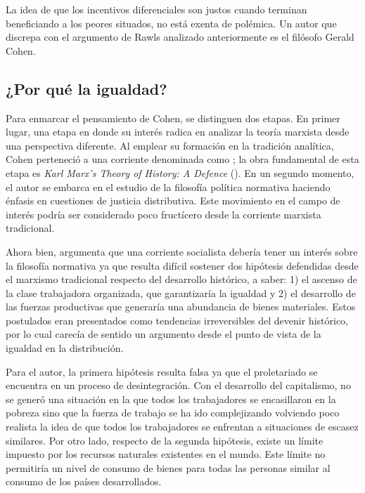 
La idea de que los incentivos diferenciales son justos cuando terminan beneficiando a los peores situados, no está exenta de polémica. Un autor que discrepa con el argumento de Rawls analizado anteriormente es el filósofo Gerald Cohen. 

\subsection{¿Por qué la igualdad?}

Para enmarcar el pensamiento de Cohen, se distinguen dos etapas. En primer lugar, una etapa en donde su interés radica en analizar la teoría marxista desde una perspectiva diferente. Al emplear su formación en la tradición analítica, Cohen perteneció a una corriente denominada como ; la obra fundamental de esta etapa es \textit{Karl Marx's Theory of History: A Defence} (\citeyear{Cohen_1978}). En un segundo momento, el autor se embarca en el estudio de la filosofía política normativa haciendo énfasis en cuestiones de justicia distributiva. Este movimiento en el campo de interés podría ser considerado poco fructícero desde la corriente marxista tradicional.

Ahora bien, \citet{Cohen_2001} argumenta que una corriente socialista debería tener un interés sobre la filosofía normativa ya que resulta difícil sostener dos hipótesis defendidas desde el marxismo tradicional respecto del desarrollo histórico, a saber: 1) el ascenso de la clase trabajadora organizada, que garantizaría la igualdad y 2) el desarrollo de las fuerzas productivas que generaría una abundancia de bienes materiales. Estos postulados eran presentados como tendencias irreversibles del devenir histórico, por lo cual carecía de sentido un argumento desde el punto de vista de la igualdad en la distribución. 

Para el autor, la primera hipótesis resulta falsa ya que el proletariado se encuentra en un proceso de desintegración. Con el desarrollo del capitalismo, no se generó una situación en la que todos los trabajadores se encasillaron en la pobreza sino que la fuerza de trabajo se ha ido complejizando volviendo poco realista la idea de que todos los trabajadores se enfrentan a situaciones de escasez similares. Por otro lado, respecto de la segunda hipótesis, existe un límite impuesto por los recursos naturales existentes en el mundo. Este límite no permitiría un nivel de consumo de bienes para todas las personas similar al consumo de los países desarrollados.

